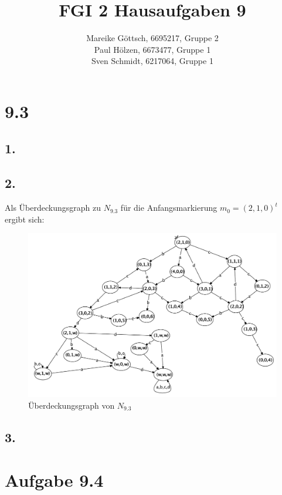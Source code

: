 \documentclass[12pt, paper=a4]{article}
\author{Mareike G\"ottsch, 6695217, Gruppe 2\\Paul H\"olzen, 6673477, Gruppe 1\\Sven Schmidt, 6217064, Gruppe 1}
\title{FGI 2 Hausaufgaben 9}
\begin{document}
\maketitle
\section*{9.3}

\subsection*{1.}

\subsection*{2.}
Als \"Uberdeckungsgraph zu \(N_{9.3}\) f\"ur die Anfangsmarkierung \(m_0=(2,1,0)^t\) ergibt sich:
\begin{figure}[h!]
	\centering
	\includegraphics[scale=0.35]{9_3_2.pdf}
	\caption{\"Uberdeckungsgraph von \(N_{9.3}\)}
\end{figure}

\subsection*{3.}


\section*{Aufgabe 9.4}
\end{document}
